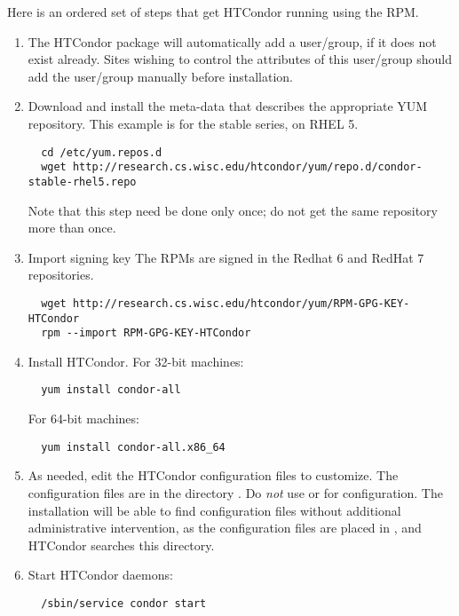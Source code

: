 Here is an ordered set of steps that get HTCondor running using the RPM.
\begin{enumerate}
\item The HTCondor package will automatically add a  user/group,
if it does not exist already.
Sites wishing to control the attributes of this user/group 
should add the  user/group manually before installation.

\item Download and install the meta-data that describes 
the appropriate YUM repository. 
This example is for the stable series, on RHEL 5. 
\footnotesize
\begin{verbatim}
  cd /etc/yum.repos.d
  wget http://research.cs.wisc.edu/htcondor/yum/repo.d/condor-stable-rhel5.repo
\end{verbatim}
\normalsize
Note that this step need be done only once;
do not get the same repository more than once.

\item Import signing key
The RPMs are signed in the Redhat 6 and RedHat 7 repositories. 
\begin{verbatim}
  wget http://research.cs.wisc.edu/htcondor/yum/RPM-GPG-KEY-HTCondor
  rpm --import RPM-GPG-KEY-HTCondor
\end{verbatim}

\item Install HTCondor.
For 32-bit machines:
\begin{verbatim}
  yum install condor-all
\end{verbatim}
For 64-bit machines:
\begin{verbatim}
  yum install condor-all.x86_64
\end{verbatim}

\item As needed, edit the HTCondor configuration files to customize.
The configuration files are in the directory  .
Do \emph{not} use  or  for configuration.
The installation will be able to find configuration files without
additional administrative intervention,
as the configuration files are placed in ,
and HTCondor searches this directory.

\item Start HTCondor daemons:
\begin{verbatim}
  /sbin/service condor start
\end{verbatim}

\end{enumerate}

